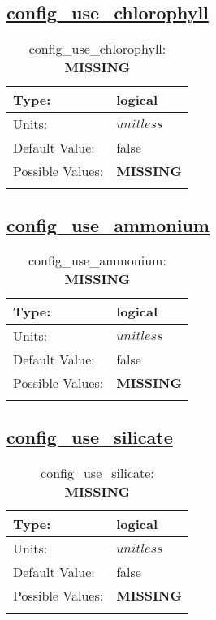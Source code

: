 \subsection[config\_use\_chlorophyll]{\hyperref[sec:nm_tab_biogeochemistry]{config\_use\_chlorophyll}}
\label{subsec:nm_sec_config_use_chlorophyll}
\begin{center}
\begin{longtable}{| p{2.0in} || p{4.0in} |}
    \hline
    Type: & logical \\
    \hline
    Units: & $unitless$ \\
    \hline
    Default Value: & false \\
    \hline
    Possible Values: & {\bf \color{red} MISSING} \\
    \hline
    \caption{config\_use\_chlorophyll: {\bf \color{red} MISSING}}
\end{longtable}
\end{center}
\subsection[config\_use\_ammonium]{\hyperref[sec:nm_tab_biogeochemistry]{config\_use\_ammonium}}
\label{subsec:nm_sec_config_use_ammonium}
\begin{center}
\begin{longtable}{| p{2.0in} || p{4.0in} |}
    \hline
    Type: & logical \\
    \hline
    Units: & $unitless$ \\
    \hline
    Default Value: & false \\
    \hline
    Possible Values: & {\bf \color{red} MISSING} \\
    \hline
    \caption{config\_use\_ammonium: {\bf \color{red} MISSING}}
\end{longtable}
\end{center}
\subsection[config\_use\_silicate]{\hyperref[sec:nm_tab_biogeochemistry]{config\_use\_silicate}}
\label{subsec:nm_sec_config_use_silicate}
\begin{center}
\begin{longtable}{| p{2.0in} || p{4.0in} |}
    \hline
    Type: & logical \\
    \hline
    Units: & $unitless$ \\
    \hline
    Default Value: & false \\
    \hline
    Possible Values: & {\bf \color{red} MISSING} \\
    \hline
    \caption{config\_use\_silicate: {\bf \color{red} MISSING}}
\end{longtable}
\end{center}
